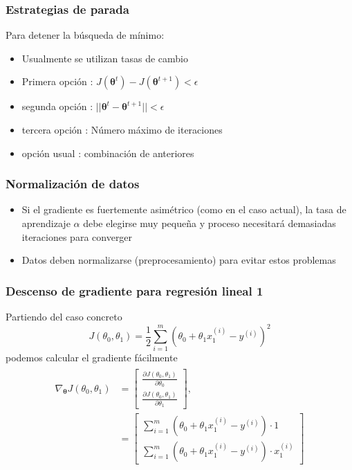 \documentclass[spanish]{beamer}
\begin{document}
\begin{frame}
\frametitle{Estrategias de parada}  
Para detener la búsqueda de mínimo: 
\begin{itemize}
\item Usualmente se utilizan tasas de cambio 
\item Primera opción : $J(\boldsymbol{\theta}^{t})- J(\boldsymbol{\theta}^{t+1}) < \epsilon$
\item segunda opción : $\vert\vert \boldsymbol{\theta}^{t}- \boldsymbol{\theta}^{t+1}\vert\vert < \epsilon$
\item tercera opción : Número máximo de iteraciones
\item opción usual : combinación de anteriores
\end{itemize}
\end{frame}
\begin{frame}
\frametitle{Normalización de datos}  
\begin{itemize}
\item Si el gradiente es fuertemente asimétrico (como en el caso actual), la tasa de aprendizaje $\alpha$  debe elegirse muy pequeña y proceso necesitará demasiadas iteraciones para converger
\item Datos deben normalizarse (preprocesamiento) para evitar estos problemas 
\end{itemize}
\end{frame}
\begin{frame}
\frametitle{Descenso de gradiente para regresión lineal 1}  
Partiendo del caso concreto 
\begin{equation*}
J(\theta_0, \theta_1)= \frac{1}{2} \sum_{i=1}^{m}(\theta_{0}+ \theta_{1}x_{1}^{(i)}-y^{(i)})^2
\end{equation*}
podemos calcular el gradiente fácilmente 
\begin{align*}
\begin{split}
\nabla_{\boldsymbol{\theta}}J(\theta_0,\theta_1) &=  \begin{bmatrix} \frac{\partial J(\theta_0,\theta_1)}{\partial \theta_0} \\ \frac{\partial J(\theta_0,\theta_1)}{\partial \theta_1} \end{bmatrix},
\\
 &= \begin{bmatrix}  \sum_{i=1}^{m}(\theta_{0}+ \theta_{1}x_{1}^{(i)}-y^{(i)}) \cdot 1  \\  \sum_{i=1}^{m}(\theta_{0}+ \theta_{1}x_{1}^{(i)}-y^{(i)}) \cdot x_{1}^{(i)} \end{bmatrix}
\end{split}
\end{align*}


\end{frame}
\end{document}
